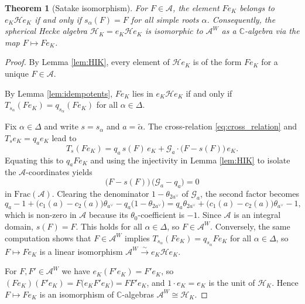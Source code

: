 \documentclass[12pt]{article}
\numberwithin{equation}{section}
\newtheorem{theorem}{Theorem}[section]
\theoremstyle{definition}
\theoremstyle{remark}
\theoremstyle{plain}
\begin{document}
\begin{theorem}[Satake isomorphism] \label{thm:spherical_iso}
For $F \in \mathcal{A}$, the element $F e_K$ belongs to $e_K \mathcal{H} e_K$ if and only if $s_\alpha(F) = F$ for all simple roots $\alpha$. Consequently, the spherical Hecke algebra $\mathcal{H}_K = e_K \mathcal{H} e_K$ is isomorphic to $\mathcal{A}^W$ as a $\mathbb{C}$-algebra via the map $F \mapsto F e_K$.
\end{theorem}
\begin{proof}
By Lemma \ref{lem:HIK}, every element of $\mathcal{H} e_K$ is of the form $F e_K$ for a unique $F \in \mathcal{A}$.

By Lemma \ref{lem:idempotents}, $F e_K$ lies in $e_K \mathcal{H} e_K$ if and only if $T_{s_\alpha} (F e_K) = q_{s_\alpha} (F e_K)$ for all $\alpha \in \Delta$.

Fix $\alpha \in \Delta$ and write $s = s_\alpha$ and $a = \tilde\alpha$. The cross-relation \eqref{eq:cross_relation} and $T_{s} e_K = q_a e_K$ lead to
\begin{equation*}
T_{s} (F e_K) = q_a\, s(F)\, e_K + \mathcal{G}_a\cdot\big(F - s(F)\big)\, e_K.
\end{equation*}
Equating this to $q_a F e_K$ and using the injectivity in Lemma \ref{lem:HIK} to isolate the $\mathcal{A}$-coordinates yields
\begin{equation*}
\big(F - s(F)\big)\,\big(\mathcal{G}_a - q_a\big) = 0
\end{equation*}
in $\mathrm{Frac}(\mathcal{A})$. Clearing the denominator $1 - \theta_{2a^\vee}$ of $\mathcal{G}_a$, the second factor becomes
\begin{equation*}
q_a - 1 + \big(c_1(a) - c_2(a)\big)\theta_{a^\vee} - q_a\big(1 - \theta_{2a^\vee}\big) = q_a\theta_{2a^\vee} + \big(c_1(a)-c_2(a)\big)\theta_{a^\vee} - 1,
\end{equation*}
which is non-zero in $\mathcal{A}$ because its $\theta_0$-coefficient is $-1$. Since $\mathcal{A}$ is an integral domain, $s(F) = F$. This holds for all $\alpha \in \Delta$, so $F \in \mathcal{A}^W$. Conversely, the same computation shows that $F \in \mathcal{A}^W$ implies $T_{s_\alpha}(Fe_K) = q_{s_\alpha} F e_K$ for all $\alpha \in \Delta$, so $F \mapsto F e_K$ is a linear isomorphism $\mathcal{A}^W \xrightarrow{\sim} e_K \mathcal{H} e_K$.

For $F, F' \in \mathcal{A}^W$ we have $e_K (F' e_K) = F' e_K$, so $(F e_K)(F' e_K) = F \big(e_K F' e_K\big) = F F' e_K$, and $1 \cdot e_K = e_K$ is the unit of $\mathcal{H}_K$. Hence $F \mapsto F e_K$ is an isomorphism of $\mathbb{C}$-algebras $\mathcal{A}^W \cong \mathcal{H}_K$.
\end{proof}
\end{document}
